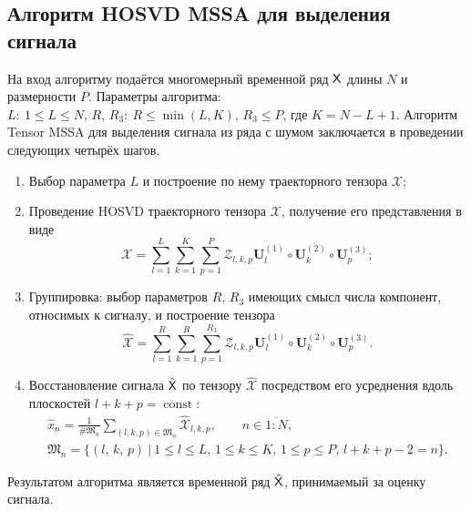 \documentclass[11pt]{article}
\theoremstyle{plain}
\theoremstyle{definition}
\theoremstyle{remark}
\begin{document}
    \subsection{Алгоритм HOSVD MSSA для выделения сигнала}\label{subsec:tensor-mssa-description}
    На вход алгоритму подаётся многомерный временной ряд $\mathsf{X}$ длины $N$ и размерности $P$.
    Параметры алгоритма: $L:\: 1\leqslant L \leqslant N,\, R,\, R_3:\: R \leqslant \min(L, K),\, R_3 \leqslant P$,
    где $K = N - L + 1$.
    Алгоритм Tensor MSSA для выделения сигнала из ряда с шумом заключается в проведении следующих четырёх шагов.
    \begin{enumerate}
        \item Выбор параметра $L$ и построение по нему траекторного тензора $\mathcal{X}$;
        \item Проведение HOSVD траекторного тензора $\mathcal{X}$, получение его представления в виде
        \begin{equation}
            \mathcal{X}=\sum_{l=1}^{L} \sum_{k=1}^{K} \sum_{p=1}^{P} \mathcal{Z}_{l,k,p} \mathbf{U}^{(1)}_{l}
            \circ \mathbf{U}^{(2)}_{k} \circ \mathbf{U}^{(3)}_{p};
            \label{eq:trajectory-hosvd}
        \end{equation}
        \item Группировка: выбор параметров $R,\, R_3$ имеющих смысл числа компонент, относимых к сигналу,
        и построение тензора
        \begin{equation*}
            \hat{\mathcal{X}}=\sum_{l=1}^R \sum_{k=1}^R \sum_{p=1}^{R_3}
            \mathcal{Z}_{l,k,p} \mathbf{U}^{(1)}_{l}\circ \mathbf{U}^{(2)}_{k} \circ \mathbf{U}^{(3)}_{p}.
        \end{equation*}
        \item Восстановление сигнала $\hat{\mathsf{X}}$ по тензору $\hat{\mathcal{X}}$ посредством его усреднения вдоль
        плоскостей $l+k+p=\operatorname{const}$:
        \begin{gather*}
            \hat{x}_n=\frac{1}{\#\mathfrak{M}_n}\sum_{(l,k,p)\in \mathfrak{M}_n} \hat{\mathcal{X}}_{l,k,p},
            \qquad n\in \overline{1:N},\\
            \mathfrak{M}_n=\{(l,\, k,\, p) \:|\: 1\leqslant l \leqslant L,\, 1\leqslant k \leqslant K,\, 1\leqslant p \leqslant P,\, l+k+p-2=n\}.
        \end{gather*}
    \end{enumerate}
    Результатом алгоритма является временной ряд $\hat{\mathsf{X}}$, принимаемый за оценку сигнала.
\end{document}

